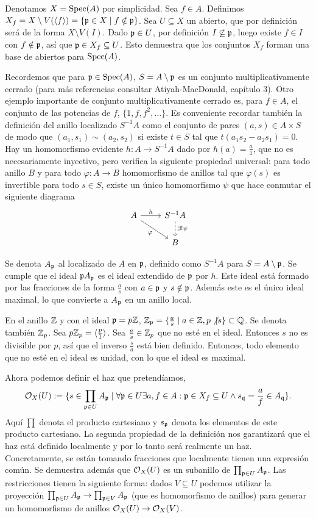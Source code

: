 \documentclass[GA.tex]{subfiles}
\begin{document}
Denotamos $X=\operatorname{Spec}(A)$ por simplicidad. Sea $f\in A$. Definimos $X_f=X\setminus V(\langle{f}\rangle)=\{{\mathfrak{p}}\in X\mid f\notin{\mathfrak{p}}\}$. Sea $U\subseteq X$ un abierto, que por definición será de la forma $X\setminus V(I)$. Dado ${\mathfrak{p}}\in U$, por definición $I\not\subseteq{\mathfrak{p}}$, luego existe $f\in I$ con $f\notin{\mathfrak{p}}$, así que ${\mathfrak{p}}\in X_f\subseteq U$. Esto demuestra que los conjuntos $X_f$ forman una base de abiertos para $\operatorname{Spec}(A)$. 

Recordemos que para ${\mathfrak{p}}\in\operatorname{Spec}(A)$, $S=A\setminus{\mathfrak{p}}$ es un conjunto multiplicativamente cerrado (para más referencias consultar Atiyah-MacDonald, capítulo 3). Otro ejemplo importante de conjunto multiplicativamente cerrado es, para $f\in A$, el conjunto de las potencias de $f$, $\{1,f,f^2,\dots\}$. Es conveniente recordar también la definición del anillo localizado $S^{-1}A$ como el conjunto de pares $(a,s)\in A\times S$ de modo que $(a_1,s_1)\sim (a_2,s_2)$ si existe $t\in S$ tal que $t(a_1s_2-a_2s_1)=0$. Hay un homomorfismo evidente $h:A\to S^{-1}A$ dado por $h(a)=\frac{a}{1}$, que no es necesariamente inyectivo, pero verifica la siguiente propiedad universal: para todo anillo $B$ y para todo $\varphi:A\to B$ homomorfismo de anillos tal que $\varphi(s)$ es invertible para todo $s\in S$, existe un único homomorfismo $\psi$ que hace conmutar el siguiente diagrama
\[
\begin{tikzcd}
A\arrow[r, "h"]\arrow[dr, "\varphi"'] & S^{-1}A\arrow[d, dashed, "\exists!\psi"]\\
& B
\end{tikzcd}
\]

Se denota $A_{\mathfrak{p}}$ al localizado de $A$ en ${\mathfrak{p}}$, definido como $S^{-1}A$ para $S=A\setminus{\mathfrak{p}}$. Se cumple que el ideal ${\mathfrak{p}} A_{\mathfrak{p}}$ es el ideal extendido de ${\mathfrak{p}}$ por $h$. Este ideal está formado por las fracciones de la forma $\frac{a}{s}$ con $a\in{\mathfrak{p}}$ y $s\notin{\mathfrak{p}}$. Además este es el único ideal maximal, lo que convierte a $A_{\mathfrak{p}}$ en un anillo local. 

\begin{ej}
En el anillo $\mathbb{Z}$ y con el ideal ${\mathfrak{p}}=p\mathbb{Z}$, $\mathbb{Z}_{\mathfrak{p}}=\{\frac{a}{s}\mid a\in\mathbb{Z}, p\not| s\}\subset\mathbb{Q}$. Se denota también $\mathbb{Z}_p$. Sea $p\mathbb{Z}_p=\langle{\frac{p}{1}}\rangle$. Sea $\frac{a}{s}\in\mathbb{Z}_p$ que no esté en el ideal. Entonces $s$ no es divisible por $p$, así que el inverso $\frac{s}{a}$ está bien definido. Entonces, todo elemento que no esté en el ideal es unidad, con lo que el ideal es maximal. 
\end{ej}

Ahora podemos definir el haz que pretendíamos, $${\mathcal O}_X(U):=\{s\in\prod_{{\mathfrak{p}}\in U}A_{\mathfrak{p}}\mid\forall{\mathfrak{p}}\in U\exists a,f\in A: {\mathfrak{p}}\in X_f\subseteq U\land s_{\mathfrak{q}}=\frac{a}{f}\in A_{\mathfrak{q}} \}.$$ Aquí $\prod$ denota el producto cartesiano y $s_{\mathfrak{p}}$ denota los elementos de este producto cartesiano. La segunda propiedad de la definición nos garantizará que el haz está definido localmente y por lo tanto será realmente un haz. Concretamente, se están tomando fracciones que localmente tienen una expresión común. Se demuestra además que ${\mathcal O}_X(U)$ es un subanillo de $\prod_{{\mathfrak{p}}\in U}A_{\mathfrak{p}}$. Las restricciones tienen la siguiente forma: dados $V\subseteq U$ podemos utilizar la proyección $\prod_{{\mathfrak{p}}\in U}A_{\mathfrak{p}}\to\prod_{{\mathfrak{p}}\in V}A_{\mathfrak{p}}$ (que es homomorfismo de anillos) para generar un homomorfismo de anillos ${\mathcal O}_X(U)\to{\mathcal O}_X(V)$. 
\end{document}
